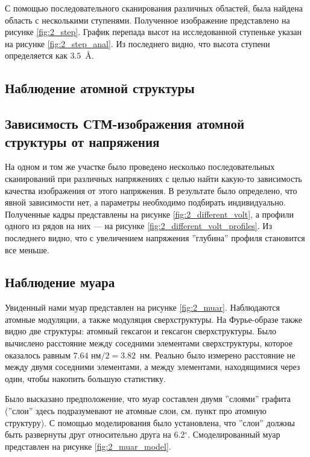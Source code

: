 \documentclass[a4paper, 12pt]{article}
\begin{document}
	С помощью последовательного сканирования различных областей, была найдена область с несколькими ступенями. Полученное изображение представлено на рисунке \ref{fig:2_step}. График перепада высот на исследованной ступеньке указан на рисунке \ref{fig:2_step_anal}. Из последнего видно, что высота ступени определяется как $3.5$~\AA.
	
	\subsection{Наблюдение атомной структуры}
	
	
	
	\subsection{Зависимость СТМ-изображения атомной структуры от напряжения}
	
	На одном и том же участке было проведено несколько последовательных сканирований при различных напряжениях с целью найти какую-то зависимость качества изображения от этого напряжения. В результате было определено, что явной зависимости нет, а параметры необходимо подбирать индивидуально. Полученные кадры представлены на рисунке \ref{fig:2_different_volt}, а профили одного из рядов на них --- на рисунке \ref{fig:2_different_volt_profiles}. Из последнего видно, что с увеличением напряжения ''глубина'' профиля становится все меньше.
	
	\subsection{Наблюдение муара}
	
	Увиденный нами муар представлен на рисунке \ref{fig:2_muar}. Наблюдаются атомные модуляции, а также модуляция сверхструктуры. На Фурье-образе также видно две структуры: атомный гексагон и гексагон сверхструктуры. Было вычислено расстояние между соседними элементами сверхструктуры, которое оказалось равным $7.64\text{ нм}/2 = 3.82$~нм. Реально было измерено расстояние не между двумя соседними элементами, а между элементами, находящимися через один, чтобы накопить большую статистику.
	
	Было высказано предположение, что муар составлен двумя ''слоями'' графита (''слои'' здесь подразумевают не атомные слои, см. пункт про атомную структуру). С помощью моделирования было установлена, что ''слои'' должны быть развернуты друг относительно друга на 6.2$^\circ$. Смоделированный муар представлен на рисунке \ref{fig:2_muar_model}.
	
\end{document}
